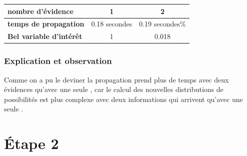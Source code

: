 \documentclass[12pt,a4paper,oneside]{book}
\begin{document}
		\begin{center}
			\begin{tabular}{ | l || c | c | }
				\hline
				\textbf{nombre d'évidence} & 1 &  2\\
				\hline
				\textbf{temps de propagation} & 0.18 secondes & 0.19 secondes\% \\
				\hline
				\textbf{Bel variable d'intérêt} & 1 & 0.018 \\
				\hline
			\end{tabular}
		\end{center}

		
	\subsubsection{Explication et observation}
    	Comme on a pu le deviner la propagation prend plus de temps avec deux évidences qu'avec une seule , car le calcul des nouvelles distributions de possibilités est plus complexe avec deux informations qui arrivent qu'avec une seule .
	
	\section{Étape 2}
\end{document}
